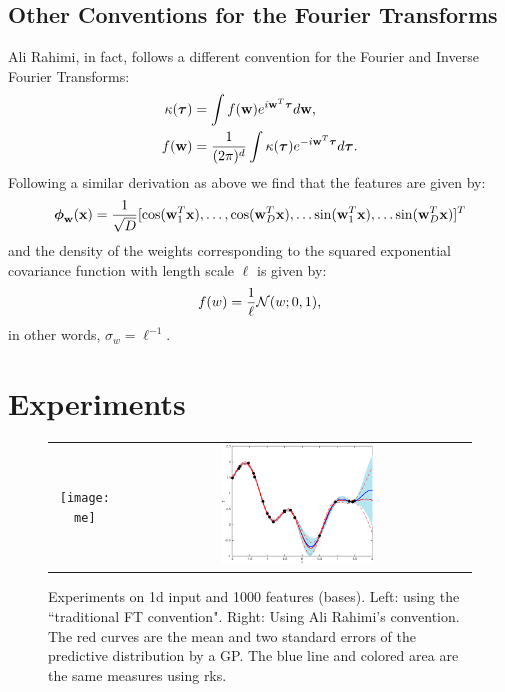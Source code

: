 \documentclass[11pt,a4paper]{article}
\newcommand{\rks}{{\sc rks}}
\renewcommand{\t}{\vecS{\tau}}
\newcommand{\w}{\vec{w}}
\newcommand{\dw}{d\vec{w}}
\newcommand{\dt}{d\t}
\renewcommand{\t}{\vecS{\tau}}
\newcommand{\x}{\vec{x}}
\newcommand{\vphi}{\vecS{\phi}}
\newcommand{\vphiw}{\vphi_{\w}}
\newcommand{\sigmaw}{\sigma_w}
\begin{document}
 \subsection{Other Conventions for the Fourier Transforms}
 Ali Rahimi, in fact, follows a different convention for the Fourier and Inverse Fourier Transforms:
 \begin{align}
	\kernel(\t) &=  \int f(\w) e^{ i \w^T \t } \dw \text{,} \\
	\label{eq:ft}
			 f(\w) &= \frac{1}{(2 \pi)^d} \int \kernel(\t) e^{-  i \w^T \t } \dt \text{.}
\end{align}
Following  a similar derivation as above we find that the features are given by:
\begin{align}
	\vphiw(\x) = \frac{1}{\sqrt{D}} [ \cos(\w_1^T \x), \ldots, \cos( \w_D^T \x),
										\ldots \sin( \w_1^T \x), \ldots \sin(\w_D^T \x)]^T 
\end{align}
 and the density of the weights corresponding to 
the squared exponential covariance function with length scale $\ell$ is given by:
\begin{equation}
	f(w) = \frac{1}{\ell} \mathcal{N}(w; 0, 1)  \text{,}
\end{equation}
in other words, $\sigmaw = \ell^{-1}$.
\section{Experiments}
\begin{figure}
\begin{tabular}{cc}
\texttt{[image: me]} &
\includegraphics[width=0.45\textwidth]{alir}
\end{tabular}
\caption{Experiments on 1d input and 1000 features (bases). Left: using the 
``traditional FT convention". Right: Using Ali Rahimi's convention. 
The red curves are the mean and two standard errors of the predictive distribution by a GP.
The blue line and colored area are the same measures using  \rks. }
\end{figure}
\end{document}
